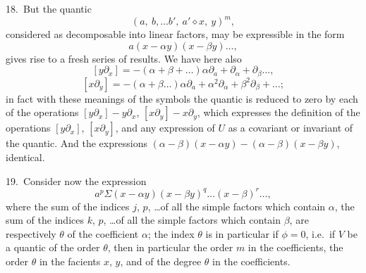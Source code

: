 \documentclass[11pt,a4paper]{article}
\begin{document}
18.\ But the quantic
\[
(a,\ b,\ldots b',\ a' \diamond x,\ y)^m,
\]
considered as decomposable into linear factors, may be expressible in the form
\[
a(x - \alpha y)(x - \beta y)\ldots,
\]
gives rise to a fresh series of results. We have here also
\[
[y\partial_x] = -(\alpha + \beta + \ldots)\alpha\partial_a + \partial_\alpha + \partial_\beta\ldots,
\]
\[
[x\partial_y] = -(\alpha + \beta\ldots)\alpha\partial_a + \alpha^2\partial_\alpha + \beta^2\partial_\beta + \ldots;
\]
in fact with these meanings of the symbols the quantic is reduced to zero by each of the operations $[y\partial_x] - y\partial_x$, $[x\partial_y] - x\partial_y$, which expresses the definition of the operations $[y\partial_x]$, $[x\partial_y]$, and any expression of $U$ as a covariant or invariant of the quantic. And the expressions $(\alpha - \beta)(x - \alpha y) - (\alpha - \beta)(x - \beta y)$, identical.

\medskip

19.\ Consider now the expression
\[
a^p \Sigma(x - \alpha y)(x - \beta y)^q\ldots (x - \beta)^r\ldots,
\]
where the sum of the indices $j$, $p$, \ldots of all the simple factors which contain $\alpha$, the sum of the indices $k$, $p$, \ldots of all the simple factors which contain $\beta$, are respectively $\theta$ of the coefficient $\alpha$; the index $\theta$ is in particular if $\phi = 0$, i.e.\ if $V$ be a quantic of the order $\theta$, then in particular the order $m$ in the coefficients, the order $\theta$ in the facients $x$, $y$, and of the degree $\theta$ in the coefficients.

\medskip
\end{document}
